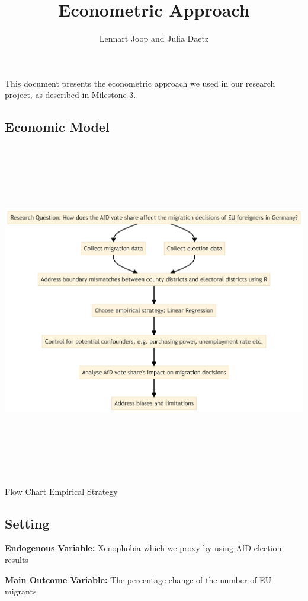 \documentclass[
  letterpaper,
  DIV=11,
  numbers=noendperiod]{scrartcl}
\title{Econometric Approach}
\author{Lennart Joop and Julia Daetz}
\date{}
\begin{document}
\maketitle

This document presents the econometric approach we used in our research
project, as described in Milestone 3.

\subsection{Economic Model}\label{economic-model}

\includegraphics[width=8.46in,height=5.77in]{Econometric_Approach_files/figure-latex/mermaid-figure-1.png}

Flow Chart Empirical Strategy

\subsection{Setting}\label{setting}

\textbf{Endogenous Variable:} Xenophobia which we proxy by using AfD
election results

\textbf{Main Outcome Variable:} The percentage change of the number of
EU migrants
\end{document}
